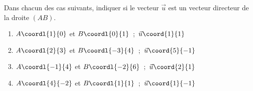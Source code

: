 \begin{exo}{}
	Dans chacun des cas suivants, indiquer si le vecteur $\vec{u}$ est un vecteur directeur de la droite $(AB)$.
	\begin{enumerate}
		\item $A\coordl{1}{0}$ et $B\coordl{0}{1}$\ ;\ $\vec{u}\coord{1}{1}$
		\item $A\coordl{2}{3}$ et $B\coordl{-3}{4}$\ ;\ $\vec{u}\coord{5}{-1}$
		\item $A\coordl{-1}{4}$ et $B\coordl{-2}{6}$\ ;\ $\vec{u}\coord{2}{1}$
		\item $A\coordl{4}{-2}$ et $B\coordl{1}{1}$\ ;\ $\vec{u}\coord{1}{-1}$
	\end{enumerate}
\end{exo}
